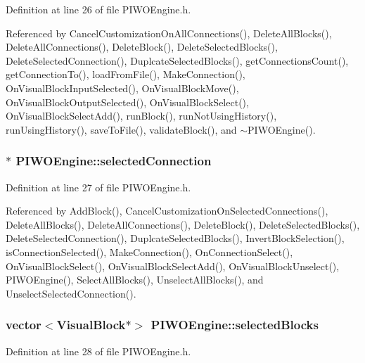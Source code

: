 Definition at line 26 of file PIWOEngine.h.

Referenced by CancelCustomizationOnAllConnections(), DeleteAllBlocks(), DeleteAllConnections(), DeleteBlock(), DeleteSelectedBlocks(), DeleteSelectedConnection(), DuplcateSelectedBlocks(), getConnectionsCount(), getConnectionTo(), loadFromFile(), MakeConnection(), OnVisualBlockInputSelected(), OnVisualBlockMove(), OnVisualBlockOutputSelected(), OnVisualBlockSelect(), OnVisualBlockSelectAdd(), runBlock(), runNotUsingHistory(), runUsingHistory(), saveToFile(), validateBlock(), and $\sim$PIWOEngine().\hypertarget{classPIWOEngine_89b3e231d010fe4a3672704b68e9fcea}{
\subsubsection[selectedConnection]{$\ast$ {\bf PIWOEngine::selectedConnection}}}
\label{classPIWOEngine_89b3e231d010fe4a3672704b68e9fcea}




Definition at line 27 of file PIWOEngine.h.

Referenced by AddBlock(), CancelCustomizationOnSelectedConnections(), DeleteAllBlocks(), DeleteAllConnections(), DeleteBlock(), DeleteSelectedBlocks(), DeleteSelectedConnection(), DuplcateSelectedBlocks(), InvertBlockSelection(), isConnectionSelected(), MakeConnection(), OnConnectionSelect(), OnVisualBlockSelect(), OnVisualBlockSelectAdd(), OnVisualBlockUnselect(), PIWOEngine(), SelectAllBlocks(), UnselectAllBlocks(), and UnselectSelectedConnection().\hypertarget{classPIWOEngine_c2cf186bc174d18bc9764b534bb5879d}{
\subsubsection[selectedBlocks]{\setlength{\rightskip}{0pt plus 5cm}vector$<${\bf VisualBlock}$\ast$$>$ {\bf PIWOEngine::selectedBlocks}}}
\label{classPIWOEngine_c2cf186bc174d18bc9764b534bb5879d}




Definition at line 28 of file PIWOEngine.h.

